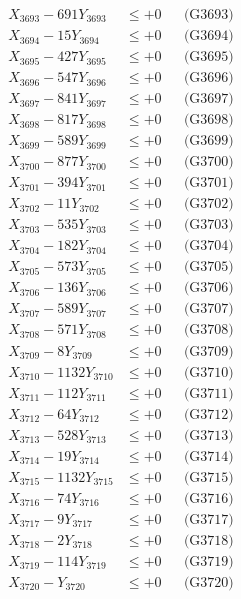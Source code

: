 \documentclass[a4paper,10pt]{article}
\begin{document}
{\begin{align}
X_{3693} - 691Y_{3693} &\leq +0 && \text{(G3693)} \\
X_{3694} - 15Y_{3694} &\leq +0 && \text{(G3694)} \\
X_{3695} - 427Y_{3695} &\leq +0 && \text{(G3695)} \\
X_{3696} - 547Y_{3696} &\leq +0 && \text{(G3696)} \\
X_{3697} - 841Y_{3697} &\leq +0 && \text{(G3697)} \\
X_{3698} - 817Y_{3698} &\leq +0 && \text{(G3698)} \\
X_{3699} - 589Y_{3699} &\leq +0 && \text{(G3699)} \\
X_{3700} - 877Y_{3700} &\leq +0 && \text{(G3700)} \\
\allowbreak
X_{3701} - 394Y_{3701} &\leq +0 && \text{(G3701)} \\
X_{3702} - 11Y_{3702} &\leq +0 && \text{(G3702)} \\
X_{3703} - 535Y_{3703} &\leq +0 && \text{(G3703)} \\
X_{3704} - 182Y_{3704} &\leq +0 && \text{(G3704)} \\
X_{3705} - 573Y_{3705} &\leq +0 && \text{(G3705)} \\
X_{3706} - 136Y_{3706} &\leq +0 && \text{(G3706)} \\
X_{3707} - 589Y_{3707} &\leq +0 && \text{(G3707)} \\
X_{3708} - 571Y_{3708} &\leq +0 && \text{(G3708)} \\
X_{3709} - 8Y_{3709} &\leq +0 && \text{(G3709)} \\
X_{3710} - 1132Y_{3710} &\leq +0 && \text{(G3710)} \\
\allowbreak
X_{3711} - 112Y_{3711} &\leq +0 && \text{(G3711)} \\
X_{3712} - 64Y_{3712} &\leq +0 && \text{(G3712)} \\
X_{3713} - 528Y_{3713} &\leq +0 && \text{(G3713)} \\
X_{3714} - 19Y_{3714} &\leq +0 && \text{(G3714)} \\
X_{3715} - 1132Y_{3715} &\leq +0 && \text{(G3715)} \\
X_{3716} - 74Y_{3716} &\leq +0 && \text{(G3716)} \\
X_{3717} - 9Y_{3717} &\leq +0 && \text{(G3717)} \\
X_{3718} - 2Y_{3718} &\leq +0 && \text{(G3718)} \\
X_{3719} - 114Y_{3719} &\leq +0 && \text{(G3719)} \\
X_{3720} - Y_{3720} &\leq +0 && \text{(G3720)} \\

\end{align}}
\end{document}
